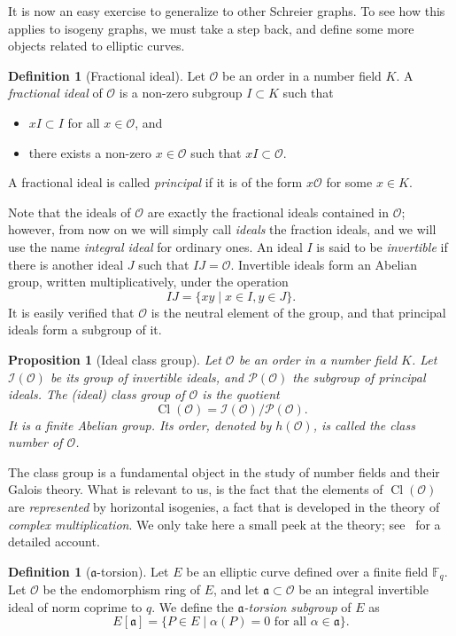 \documentclass[10pt]{article}
\theoremstyle{plain}
\newtheorem{proposition}[theorem]{Proposition}
\theoremstyle{definition}
\newtheorem{definition}[theorem]{Definition}
\DeclareMathOperator{\Cl}{Cl}
\def\F{\ensuremath{\mathbb{F}}}
\def\O{\ensuremath{\mathcal{O}}}
\def\a{\ensuremath{\mathfrak{a}}}
\begin{document}
It is now an easy exercise to generalize to other Schreier graphs. %
To see how this applies to isogeny graphs, we must take a step back,
and define some more objects related to elliptic curves.

\begin{definition}[Fractional ideal]
  Let $\O$ be an order in a number field $K$. A \emph{fractional
    ideal} of $\O$ is a non-zero subgroup $I⊂K$ such that
  \begin{itemize}
  \item $xI⊂I$ for all $x∈\O$, and
  \item there exists a non-zero $x∈\O$ such that $xI⊂\O$.
  \end{itemize}
  
  A fractional ideal is called \emph{principal} if it is of the form
  $x\O$ for some $x∈K$.
\end{definition}

Note that the ideals of $\O$ are exactly the fractional ideals
contained in $\O$; however, from now on we will simply call
\emph{ideals} the fraction ideals, and we will use the name
\emph{integral ideal} for ordinary ones. %
An ideal $I$ is said to be \emph{invertible} if there is another ideal
$J$ such that $IJ=\O$. %
Invertible ideals form an Abelian group, written multiplicatively,
under the operation
\[IJ = \{ xy \;|\; x∈I, y∈J \}.\] %
It is easily verified that $\O$ is the neutral element of the group,
and that principal ideals form a subgroup of it.

\begin{proposition}[Ideal class group]
  Let $\O$ be an order in a number field $K$. %
  Let $\mathcal{I}(\O)$ be its group of invertible ideals, and
  $\mathcal{P}(\O)$ the subgroup of principal ideals. %
  The \emph{(ideal) class group} of $\O$ is the quotient
  \[\Cl(\O) = \mathcal{I}(\O)/\mathcal{P}(\O).\]
  It is a finite Abelian group. %
  Its order, denoted by $h(\O)$, is called the \emph{class number} of
  $\O$.
\end{proposition}

The class group is a fundamental object in the study of number fields
and their Galois theory. %
What is relevant to us, is the fact that the elements of $\Cl(\O)$ are
\emph{represented} by horizontal isogenies, a fact that is developed
in the theory of \emph{complex multiplication}. %
We only take here a small peek at the theory;
see~\cite{lang1987elliptic,silverman:advanced,cox2011primes} for a
detailed account.

\begin{definition}[$\a$-torsion]
  Let $E$ be an elliptic curve defined over a finite field $\F_q$. %
  Let $\O$ be the endomorphism ring of $E$, and let $\a⊂\O$
  be an integral invertible ideal of norm coprime to $q$. %
  We define the \emph{$\a$-torsion subgroup} of $E$ as
  \[E[\a] = \{P∈E \;|\; α(P) = 0 \text{ for all } α∈\a\}.\] %
\end{definition}
\end{document}
